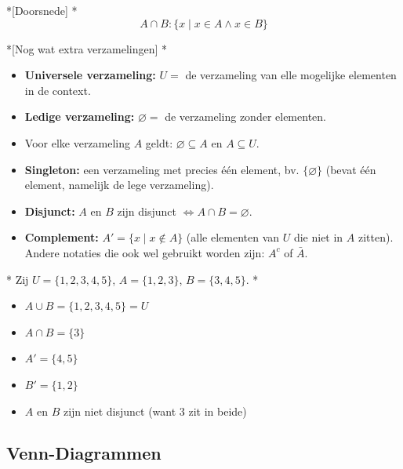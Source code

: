 \begin{nicedefinition}*[Doorsnede]
    \nextpart[Doorsnede:]*
    \begin{equation*}
        A \cap B : \{x \mid x \in A \land x \in B\}
    \end{equation*}
\end{nicedefinition}

\newpage
\begin{nicedefinition}*[Nog wat extra verzamelingen]
    \nextpart[]*
    \begin{itemize}
        \item \textbf{Universele verzameling:} $U =$ de verzameling van elle mogelijke elementen in de context.
        \item \textbf{Ledige verzameling:} $\varnothing =$ de verzameling zonder elementen.
        \item Voor elke verzameling $A$ geldt: $\varnothing \subseteq A \text{ en } A \subseteq U$.
        \item \textbf{Singleton:} een verzameling met precies één element, bv. $\{\varnothing\}$ (bevat één element, namelijk de lege verzameling).
        \item \textbf{Disjunct:} $A$ en $B$ zijn disjunct $\Longleftrightarrow A \cap B = \varnothing$.
        \item \textbf{Complement:} $A' = \{x \mid x \notin A\}$ (alle elementen van $U$ die niet in $A$ zitten). Andere notaties die ook wel gebruikt worden zijn: $A^c$ of $\bar{A}$.
    \end{itemize}
\end{nicedefinition}

\begin{niceexample}*
    Zij $U = \{1,2,3,4,5\}$, $A = \{1, 2, 3\}$, $B = \{3,4,5\}$.
    \nextpart[Dan:]*
    \begin{itemize}
        \item $A \cup B = \{1,2,3,4,5\} = U$
        \item $A \cap B = \{3\}$
        \item $A' = \{4,5\}$
        \item $B' = \{1,2\}$
        \item $A$ en $B$ zijn niet disjunct (want 3 zit in beide)
    \end{itemize}
\end{niceexample}

\subsection{Venn-Diagrammen}

